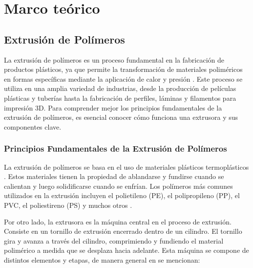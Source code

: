 \documentclass[14pt,oneside]{extarticle} %
\begin{document}
\section{Marco teórico}

\subsection{Extrusión de Polímeros}

La extrusión de polímeros es un proceso fundamental en la fabricación de productos plásticos, ya que permite la transformación de materiales poliméricos en formas específicas mediante la aplicación de calor y presión \cite{white2003}. Este proceso se utiliza en una amplia variedad de industrias, desde la producción de películas plásticas y tuberías hasta la fabricación de perfiles, láminas y filamentos para impresión 3D. Para comprender mejor los principios fundamentales de la extrusión de polímeros, es esencial conocer cómo funciona una extrusora y sus componentes clave.

\subsubsection{Principios Fundamentales de la Extrusión de Polímeros}

La extrusión de polímeros se basa en el uso de materiales plásticos termoplásticos \cite{tadmor2006}. Estos materiales tienen la propiedad de ablandarse y fundirse cuando se calientan y luego solidificarse cuando se enfrían. Los polímeros más comunes utilizados en la extrusión incluyen el polietileno (PE), el polipropileno (PP), el PVC, el poliestireno (PS) y muchos otros \cite{mohanty2002}. 

Por otro lado, la extrusora es la máquina central en el proceso de extrusión. Consiste en un tornillo de extrusión encerrado dentro de un cilindro. El tornillo gira y avanza a través del cilindro, comprimiendo y fundiendo el material polimérico a medida que se desplaza hacia adelante. Esta máquina se compone de distintos elementos y etapas, de manera general en \cite{wagner2009} se mencionan: 
\end{document}

